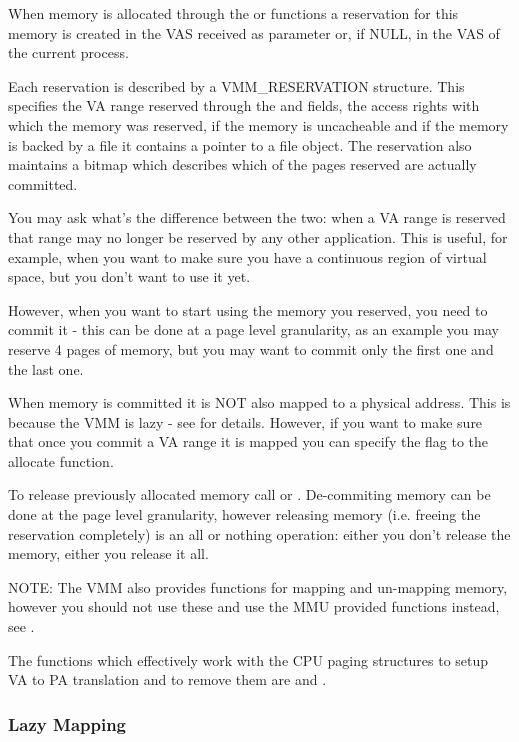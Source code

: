 \begin{appendices}
When memory is allocated through the  or  functions a
reservation for this memory is created in the VAS received as parameter or, if NULL, in the VAS of
the current process.

Each reservation is described by a VMM\_RESERVATION structure. This specifies the VA range reserved
through the  and  fields, the access rights with which the memory was
reserved, if the memory is uncacheable and if the memory is backed by a file it contains a pointer
to a file object. The reservation also maintains a bitmap which describes which of the pages reserved
are actually committed.

You may ask what's the difference between the two: when a VA range is reserved that range may no
longer be reserved by any other application. This is useful, for example, when you want to make sure
you have a continuous region of virtual space, but you don't want to use it yet.

However, when you want to start using the memory you reserved, you need to commit it - this can be
done at a page level granularity, as an example you may reserve 4 pages of memory, but you may want 
to commit only the first one and the last one.

When memory is committed it is NOT also mapped to a physical address. This is because the VMM is
lazy - see  for details. However, if you want to make sure that once you 
commit a VA range it is mapped you can specify the  flag
to the allocate function.

To release previously allocated memory call  or . De-commiting
memory can be done at the page level granularity, however releasing memory (i.e. freeing the 
reservation completely) is an all or nothing operation: either you don't release the memory, either
you release it all.

NOTE: The VMM also provides functions for mapping and un-mapping memory, however you should not use
these and use the MMU provided functions instead, see .

The functions which effectively work with the CPU paging structures to setup VA to PA translation
and to remove them are  and .

\subsubsection{Lazy Mapping}
\label{sect:LazyMapping}


\end{appendices}
